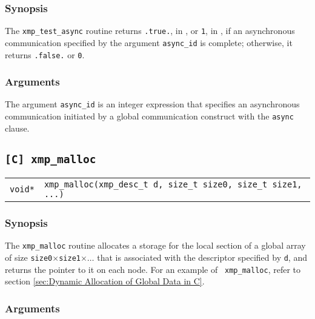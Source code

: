 \subsubsection*{Synopsis}

The {\tt xmp\_test\_async} routine returns {\tt .true.}, in {\XMPF}, or
{\tt 1}, in {\XMPC}, if an asynchronous communication specified by the
argument {\tt async\_id} is complete; otherwise, it returns {\tt .false.}
or {\tt 0}.

\subsubsection*{Arguments}

The argument {\tt async\_id} is an integer expression that specifies an
asynchronous communication initiated by a global communication construct
with the {\tt async} clause.



\subsection{\tt [C] xmp\_malloc} \label{subsec: xmp_malloc}

\begin{tabular}{ll}

{\tt void*} & {\tt xmp\_malloc(xmp\_desc\_t d, size\_t size0, size\_t
  size1, ...)}

\end{tabular}

\subsubsection*{Synopsis}

The {\tt xmp\_malloc} routine allocates a storage for the local section
of a global array of size {\tt size0}$\times${\tt size1}$\times\ldots$
that is associated with the descriptor specified by {\tt d}, 
%
and returns the pointer to it on each node. For an example of {\tt
xmp\_malloc}, refer to section \ref{sec:Dynamic Allocation of Global Data in C}.

\subsubsection*{Arguments}


